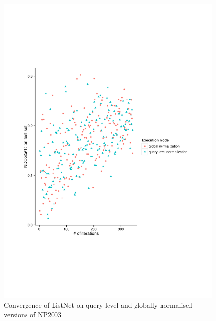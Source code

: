 \begin{figure}
\centering
\includegraphics[trim=5cm 5cm 5cm 5cm, scale=0.85]{gfx/convergence_np2003.pdf}
\caption{Convergence of ListNet on query-level and globally normalised versions of NP2003}
\label{fig:convergence_np2003}
\end{figure}

